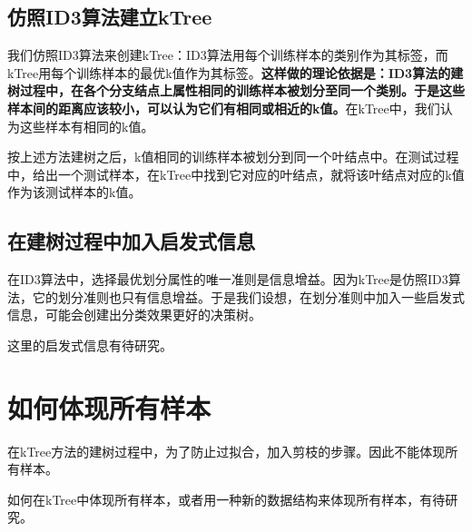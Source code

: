 \documentclass{ctexart}
\begin{document}
	\subsection{仿照ID3算法建立kTree}
	我们仿照ID3算法来创建kTree：ID3算法用每个训练样本的类别作为其标签，而kTree用每个训练样本的最优k值作为其标签。{\bfseries 这样做的理论依据是：ID3算法的建树过程中，在各个分支结点上属性相同的训练样本被划分至同一个类别。于是这些样本间的距离应该较小，可以认为它们有相同或相近的k值。}在kTree中，我们认为这些样本有相同的k值。
	
	按上述方法建树之后，k值相同的训练样本被划分到同一个叶结点中。在测试过程中，给出一个测试样本，在kTree中找到它对应的叶结点，就将该叶结点对应的k值作为该测试样本的k值。
	\subsection{在建树过程中加入启发式信息}
	在ID3算法中，选择最优划分属性的唯一准则是信息增益。因为kTree是仿照ID3算法，它的划分准则也只有信息增益。于是我们设想，在划分准则中加入一些启发式信息，可能会创建出分类效果更好的决策树。
	
	这里的启发式信息有待研究。
	\section{如何体现所有样本}
	在kTree方法的建树过程中，为了防止过拟合，加入剪枝的步骤。因此不能体现所有样本。
	
	如何在kTree中体现所有样本，或者用一种新的数据结构来体现所有样本，有待研究。
	
\end{document}

